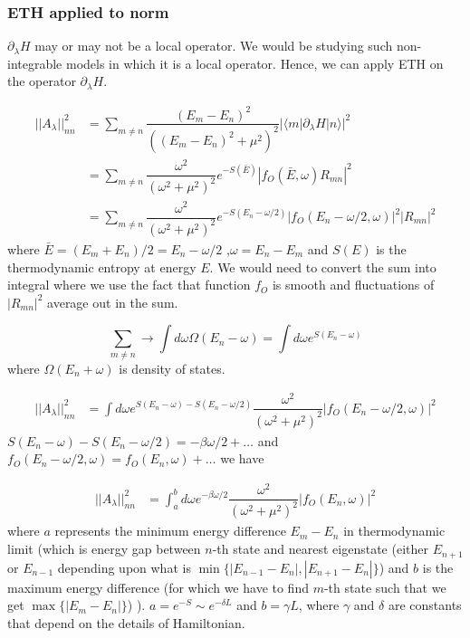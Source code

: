 \documentclass[11pt,a4paper]{article}
\begin{document}
\subsubsection{ETH applied to norm}
$\partial_{\lambda}H$ may or may not be a local operator. We would be studying such non-integrable models in which it is a local operator. Hence, we can apply ETH on the operator $\partial_{\lambda}H$.

\begin{align*}
||A_{\lambda}||^2_{nn} &= \sum_{m \neq n}  \dfrac{(E_m-E_n)^2}{((E_m-E_n)^2 + \mu^2)^2} |\langle m | \partial_{\lambda}H| n \rangle|^2\\
&=\sum_{m \neq n}  \dfrac{\omega^2}{(\omega^2 + \mu^2)^2} e^{-S(\bar{E})} |f_O(\bar{E}, \omega) R_{mn}|^2\\
&=\sum_{m \neq n}  \dfrac{\omega^2}{(\omega^2 + \mu^2)^2} e^{-S(E_n -\omega/2)} |f_O(E_n - \omega/2, \omega)|^2 |R_{mn}|^2
\end{align*}
where $\bar{E}= (E_m +E_n)/2=E_n - \omega/2$ ,$ \omega= E_n- E_m$ and $S(E)$ is the thermodynamic entropy at energy $E$.
We would need to convert the sum into integral where we use the fact that function $f_O$ is smooth and fluctuations of $|R_{mn}|^2$ average out in the sum.

\begin{equation}
\sum_{m \neq n}  \rightarrow \int d \omega \Omega(E_{n}- \omega)= \int d \omega e^{S(E_{n}- \omega)}
\end{equation}
where $\Omega(E_{n}+ \omega)$ is density of states.


\begin{align*}
||A_{\lambda}||^2_{nn} &=\int d \omega e^{S(E_{n}- \omega)-S(E_n -\omega/2)} \dfrac{\omega^2}{(\omega^2 + \mu^2)^2}  |f_O(E_n - \omega/2, \omega)|^2 
\end{align*}
$S(E_{n}- \omega)-S(E_n -\omega/2) = -\beta \omega/2 + \ldots $ and $f_O(E_n - \omega/2, \omega)=f_O(E_n, \omega) + \ldots $ we have

\begin{align*}
||A_{\lambda}||^2_{nn} &=\int_a^{b} d \omega e^{-\beta \omega/2} \dfrac{\omega^2}{(\omega^2 + \mu^2)^2}  |f_O(E_n, \omega)|^2 
\end{align*}
where $a$ represents the minimum energy difference $E_m-E_n$ in thermodynamic limit (which is energy gap between $n$-th state and nearest eigenstate (either $E_{n+1}$ or $E_{n-1}$ depending upon what is $\min \{|E_{n-1}-E_{n}|,|E_{n+1}-E_{n}| \}$) and $b$ is the maximum energy difference (for which we have to find $m$-th state such that we get $\max \{|E_{m}-E_{n}|\}$) ). $a= e^{-S} \sim e^{-\delta L}$ and $b= \gamma L$, where $\gamma$ and $\delta$ are constants that depend on the details of Hamiltonian.
\end{document}
